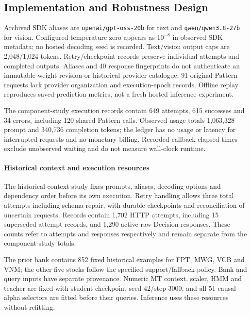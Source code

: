 \subsection{Implementation and Robustness Design}
Archived SDK aliases are \texttt{openai/gpt-oss-20b} for text and \texttt{qwen/qwen3.8-27b} for vision. Configured temperature zero appears as $10^{-8}$ in observed SDK metadata; no hosted decoding seed is recorded. Text/vision output caps are 2,048/1,024 tokens. Retry/checkpoint records preserve individual attempts and completed outputs. Aliases and 40 response fingerprints do not authenticate an immutable weight revision or historical provider catalogue; 91 original Pattern requests lack provider organization and execution-epoch records. Offline replay reproduces saved-prediction metrics, not a fresh hosted inference experiment.

The component-study execution records contain 649 attempts, 615 successes and 34 errors, including 120 shared Pattern calls. Observed usage totals 1,063,328 prompt and 340,736 completion tokens; the ledger has no usage or latency for interrupted requests and no monetary billing. Recorded callback elapsed times exclude unobserved waiting and do not measure wall-clock runtime.

\paragraph{Historical context and execution resources}
The historical-context study fixes prompts, aliases, decoding options and dependency order before its own execution. Retry handling allows three total attempts including schema repair, with durable checkpoints and reconciliation of uncertain requests. Records contain 1,702 HTTP attempts, including 15 superseded attempt records, and 1,290 active raw Decision responses. These counts refer to attempts and responses respectively and remain separate from the component-study totals.

The prior bank contains 852 fixed historical examples for FPT, MWG, VCB and VNM; the other five stocks follow the specified support/fallback policy. Bank and query inputs have separate provenance. Numeric MT context, scaler, HMM and teacher are fixed with student checkpoint seed 42/step 3000, and all 51 causal alpha selectors are fitted before their queries. Inference uses these resources without refitting.
